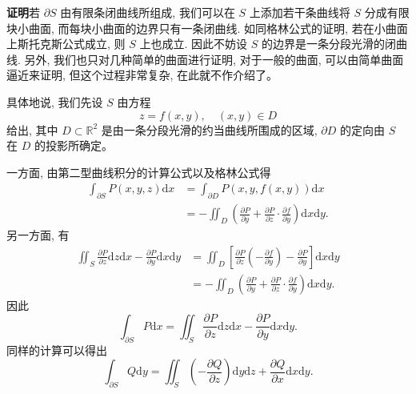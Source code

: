 \documentclass[UTF8, 12pt, fontset=fandol, oneside]{ctexart}
\begin{document}
\noindent\textbf{证明}\quad 若 $\partial S$ 由有限条闭曲线所组成, 我们可以在 $S$ 上添加若干条曲线将 $S$ 分成有限块小曲面, 而每块小曲面的边界只有一条闭曲线. 如同格林公式的证明, 若在小曲面上斯托克斯公式成立, 则 $S$ 上也成立. 因此不妨设 $S$ 的边界是一条分段光滑的闭曲线. 另外, 我们也只对几种简单的曲面进行证明, 对于一般的曲面, 可以由简单曲面逼近来证明, 但这个过程非常复杂, 在此就不作介绍了。

具体地说, 我们先设 $S$ 由方程
\begin{equation}
  z=f(x,y),\quad (x,y)\in D
  \tag{16.5.1}
\end{equation}
给出, 其中 $D\subset\mathbb R^2$ 是由一条分段光滑的约当曲线所围成的区域, $\partial D$ 的定向由 $S$ 在 $D$ 的投影所确定。

一方面, 由第二型曲线积分的计算公式以及格林公式得
\[
\begin{aligned}
  \int_{\partial S}P(x,y,z)\mathrm dx
  &=\int_{\partial D}P(x,y,f(x,y))\mathrm dx\\
  &=-\iint_D\left(\frac{\partial P}{\partial y}
    +\frac{\partial P}{\partial z}\cdot\frac{\partial f}{\partial y}\right)\mathrm dx\mathrm dy.
\end{aligned}
\]
另一方面, 有
\[
\begin{aligned}
  \iint_S\frac{\partial P}{\partial z}\mathrm dz\mathrm dx
  -\frac{\partial P}{\partial y}\mathrm dx\mathrm dy
  &=\iint_D\left[\frac{\partial P}{\partial z}\left(-\frac{\partial f}{\partial y}\right)
    -\frac{\partial P}{\partial y}\right]\mathrm dx\mathrm dy\\
  &=-\iint_D\left(\frac{\partial P}{\partial y}
    +\frac{\partial P}{\partial z}\cdot\frac{\partial f}{\partial y}\right)\mathrm dx\mathrm dy.
\end{aligned}
\]
因此
\[
  \int_{\partial S}P\mathrm dx
  =\iint_S\frac{\partial P}{\partial z}\mathrm dz\mathrm dx
    -\frac{\partial P}{\partial y}\mathrm dx\mathrm dy.
\]
同样的计算可以得出
\[
  \int_{\partial S}Q\mathrm dy
  =\iint_S\left(-\frac{\partial Q}{\partial z}\right)\mathrm dy\mathrm dz
    +\frac{\partial Q}{\partial x}\mathrm dx\mathrm dy.
\]
\end{document}
